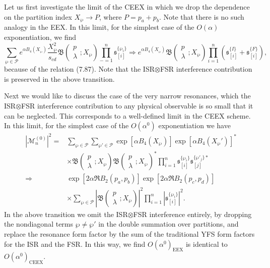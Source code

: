 Let us first investigate the limit of the CEEX in which we drop the dependence on the partition index $X_\wp\to P$, where $P=p_a+p_b$. Note that there is no such analogy in the EEX. In this limit, for the simplest case of the $O(\alpha)$ exponentiation, we find
\begin{equation}
\sum_{\wp\in\mathcal{P}}e^{\alpha B_4(X_\wp)}\frac{X^2_\wp}{s_{cd}}\mathfrak{B}\left(
\begin{array}{c}
p\\\lambda
\end{array};X_\wp\right)\prod_{-=1}^{n}\mathfrak{s}^{\{\wp_i\}}_{[i]}\Rightarrow e^{\alpha B_4(X_\wp)}\mathfrak{B}\left(
\begin{array}{c}
p\\\lambda
\end{array};X_\wp\right)\prod_{i=1}^{n}(\mathfrak{s}^{\{I\}}_{[i]}+\mathfrak{s}^{\{F\}}_{[i]}),
\end{equation}
because of the relation (7.87). Note that the ISR$\otimes$FSR interference contribution is preserved in the above transition. 

Next we would like to discuss the case of the very narrow resonances, which the ISR$\otimes$FSR interference contribution to any physical observable is so small that it can be neglected. This corresponds to a well-defined limit in the CEEX scheme. In this limit, for the simplest case of the $O(\alpha^0)$ exponentiation we have
\begin{align}
|\mathcal{M}^{(0)}_n|^2=&\sum_{\wp\in\mathcal{P}}\sum_{\wp'\in\mathcal{P}}\exp[\alpha B_4(X_\wp)]\exp[\alpha B_4(X_\wp')]^\ast\nonumber\\
&\times \mathfrak{B}\left(
\begin{array}{c}
p\\\lambda
\end{array};X_\wp\right)\mathfrak{B}\left(
\begin{array}{c}
p\\\lambda
\end{array};X_\wp\right)^\ast\prod_{i=1}^{n}\mathfrak{s}^{\{\wp_i\}}_{[i]}\mathfrak{s}^{\{\wp'_j\}\ast}_{[j]}\nonumber\\
\Rightarrow&\exp[2\alpha\Re B_2(p_a,p_b)]\exp[2\alpha\Re B_2(p_c,p_d)]\nonumber\\
&\times\sum_{\wp\in\mathcal{P}}\left|\mathfrak{B}\left(
\begin{array}{c}
p\\\lambda
\end{array};X_\wp\right)\right|^2\prod_{i=1}^{n}\left| \mathfrak{s}^{\{\wp_i\}}_{[i]} \right|^2.
\end{align}
In the above transition we omit the ISR$\otimes$FSR interference entirely, by dropping the nondiagonal terms $\wp\neq\wp'$ in the double summation over partitions, and replace the resonance form factor by the sum of the traditional YFS form factors for the ISR and the FSR. In this way, we find $O(\alpha^0)_\text{EEX}$ is identical to $O(\alpha^0)_\text{CEEX}$. 

